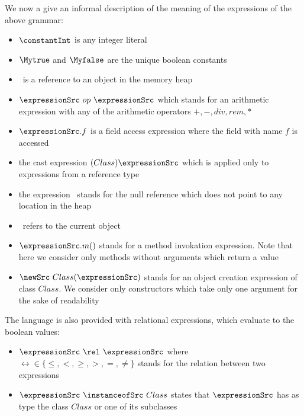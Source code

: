     
We now  a give an informal description of the meaning of the expressions of the above grammar:
\begin{itemize}
   
   \item $ \constantInt  $ is any integer literal 
   

   \item  $ \Mytrue$ and $\Myfalse$ are the unique boolean  constants 

   \item \constantRef \ is a reference to an object in the memory heap
   
   \item  $\expressionSrc \ op \ \expressionSrc$ which stands for an arithmetic expression with any of the arithmetic 
          operators $ + , - , div , rem, * $
	   
   
   
   \item $ \expressionSrc.f $ is a field access expression where the field with name $f$ is accessed

   \item the cast expression $(Class) \expressionSrc$  which is applied only to expressions from a reference type
   
   \item the expression \Mynull \ stands for the null reference which does not point to any location in the heap
  
   \item \this \ refers to the current object 
   \item $ \expressionSrc.m()  $ stands for a method invokation expression. Note that here we consider
         only methods without arguments which return a value
   \item $\newSrc \ Class(\expressionSrc )$ stands for an object creation expression of class $Class$. We consider only constructors which take
         only one argument for the sake of readability 
 

   
\end{itemize}




The language is also provided with relational expressions, which evaluate to the boolean values: 

\begin{itemize}
   
   \item $\expressionSrc \ \rel \ \expressionSrc $ where $\rel  \in \{ \le, < ,  \ge, >, = , \neq \} $ stands for the relation between two expressions 
   
   \item  $\expressionSrc \ \instanceofSrc \ Class $ states that $\expressionSrc$ has as type the class $Class $ or one of its subclasses 
\end{itemize}






